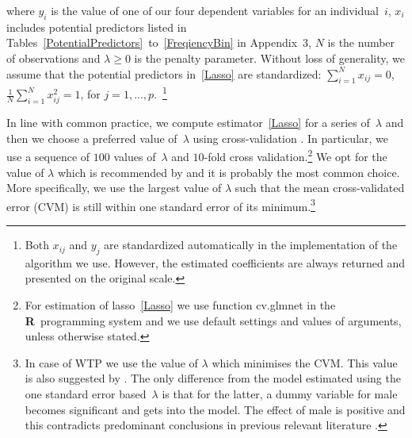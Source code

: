 \documentclass[a4paper,12pt]{article}
\begin{document}

where $y_i$ is the value of one of our four dependent variables for an individual~$i$, $x_i$ includes potential predictors listed in Tables~\ref{PotentialPredictors}~to~\ref{FreqiencyBin} in Appendix~$3$, $N$ is the number of observations and $\lambda \geq 0$ is the penalty parameter. Without loss of generality, we assume that the potential predictors in~\eqref{Lasso} are standardized: ${\sum_{i=1}^{N}x_{ij} =0}$, ${\frac{1}{N}\sum_{i=1}^{N}x_{ij}^2=1}$, for $j=1,...,p$.~\footnote{Both $x_{ij}$ and $y_j$ are standardized automatically in the implementation of the algorithm  we use. However, the estimated coefficients are always returned and presented on the original scale.} 

In line with common practice, we compute estimator~\eqref{Lasso} for a series of~$\lambda$ and then we choose a preferred value of~$\lambda$ using cross-validation \citep{statisHighDimData}. In particular, we use a sequence of $100$ values of~$\lambda$ and $10$\nobreakdash-fold cross validation.\footnote{For estimation of lasso~\eqref{Lasso} we use function cv.glmnet in the \textbf{\textsf{R}}~programming system \citep{RRRR} and we use default settings and values of arguments, unless otherwise stated.} We opt for the value of $\lambda$ which is recommended by \citet{Friedman2010} and it is probably the most common choice. More specifically, we use the largest value of $\lambda$  such that the mean cross-validated error (CVM) is still within one standard error of its minimum.\footnote{In case of WTP we use the value of $\lambda$ which minimises the CVM. This value is also  suggested by \citet{Friedman2010}. The only difference from the model estimated using the one standard error based~$\lambda$ is that for the latter, a dummy variable for male becomes significant and gets into the model. The effect of male is positive and this contradicts predominant conclusions in previous relevant literature \citetext{e.g. \citealt*{Hamilton2011, McCright2010, HamiltonKeim2009, Flynn1994}}.}
\end{document}
